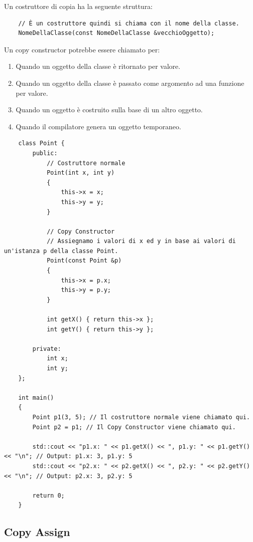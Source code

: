 \textsf{\small Un costruttore di copia ha la seguente struttura: } \\

\begin{lstlisting}
	// È un costruttore quindi si chiama con il nome della classe.
	NomeDellaClasse(const NomeDellaClasse &vecchioOggetto);
\end{lstlisting}

\textsf{\small Un copy constructor potrebbe essere chiamato per:}

\begin{enumerate}
	\item \textsf{\small Quando un oggetto della classe è ritornato per valore.}
	\item \textsf{\small Quando un oggetto della classe è passato come argomento ad una funzione per valore.}
	\item \textsf{\small Quando un oggetto è costruito sulla base di un altro oggetto.}
	\item \textsf{\small Quando il compilatore genera un oggetto temporaneo.}
\end{enumerate}

\begin{lstlisting}
	class Point {
		public:
			// Costruttore normale
			Point(int x, int y)
			{
				this->x = x;
				this->y = y;
			}
			
			// Copy Constructor
			// Assiegnamo i valori di x ed y in base ai valori di un'istanza p della classe Point.
			Point(const Point &p)
			{
				this->x = p.x;
				this->y = p.y;
			}
		
			int getX() { return this->x };
			int getY() { return this->y };
		
		private:
			int x;
			int y;
	};

	int main()
	{
		Point p1(3, 5); // Il costruttore normale viene chiamato qui.
		Point p2 = p1; // Il Copy Constructor viene chiamato qui.
		
		std::cout << "p1.x: " << p1.getX() << ", p1.y: " << p1.getY() << "\n"; // Output: p1.x: 3, p1.y: 5
		std::cout << "p2.x: " << p2.getX() << ", p2.y: " << p2.getY() << "\n"; // Output: p2.x: 3, p2.y: 5
		
		return 0;
	}
\end{lstlisting}

\subsection{Copy Assign}

